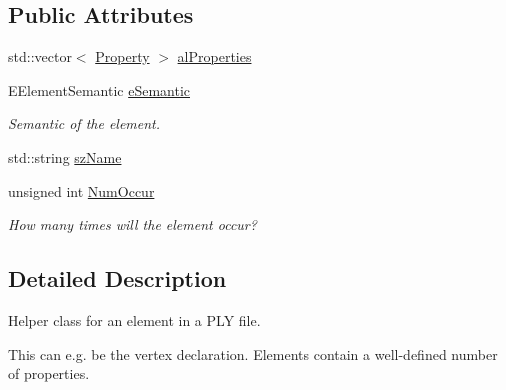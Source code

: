 \subsection*{Public Attributes}
\begin{DoxyCompactItemize}
\item 
std\+::vector$<$ \hyperlink{class_assimp_1_1_p_l_y_1_1_property}{Property} $>$ \hyperlink{class_assimp_1_1_p_l_y_1_1_element_ad8d8d41a6299cc101f555b8811f648ac}{al\+Properties}
\item 
\hypertarget{class_assimp_1_1_p_l_y_1_1_element_ab0acbea60097d194c29613f7364a9a90}{E\+Element\+Semantic \hyperlink{class_assimp_1_1_p_l_y_1_1_element_ab0acbea60097d194c29613f7364a9a90}{e\+Semantic}}\label{class_assimp_1_1_p_l_y_1_1_element_ab0acbea60097d194c29613f7364a9a90}

\begin{DoxyCompactList}\small\item\em Semantic of the element. \end{DoxyCompactList}\item 
std\+::string \hyperlink{class_assimp_1_1_p_l_y_1_1_element_adcc1a2251597daee1cea8065f9325b5f}{sz\+Name}
\item 
\hypertarget{class_assimp_1_1_p_l_y_1_1_element_a9d03a73bc72e34c9d040e960a35695eb}{unsigned int \hyperlink{class_assimp_1_1_p_l_y_1_1_element_a9d03a73bc72e34c9d040e960a35695eb}{Num\+Occur}}\label{class_assimp_1_1_p_l_y_1_1_element_a9d03a73bc72e34c9d040e960a35695eb}

\begin{DoxyCompactList}\small\item\em How many times will the element occur? \end{DoxyCompactList}\end{DoxyCompactItemize}


\subsection{Detailed Description}
Helper class for an element in a P\+L\+Y file. 

This can e.\+g. be the vertex declaration. Elements contain a well-\/defined number of properties. 

